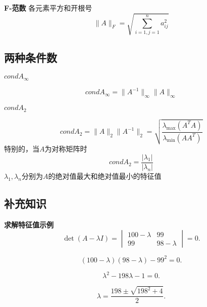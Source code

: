 \textbf{F-范数} \quad 各元素平方和开根号
    \[
    \|A\|_F = \sqrt{\sum_{i=1,j=1}^{n} a_{ij}^2}
    \]


\subsection{两种条件数}

\textbf{$condA_\infty$}

\[
condA_\infty = \|A^{-1}\|_{\infty} \|A\|_{\infty}
\]

\textbf{$condA_2$}

\[
condA_2 = \|A\|_{2} \|A^{-1}\|_{2} = \sqrt{\frac{\lambda_{\max}(A^T A)}{\lambda_{\min}(A A^T)}}
\]
特别的，当$A$为对称矩阵时
\[
condA_2 = \frac{|\lambda_{1}|}{|\lambda_{n}|}
\]
$\lambda_1,\lambda_n$分别为$A$的绝对值最大和绝对值最小的特征值

\subsection{补充知识}

\textbf{求解特征值示例}
\[
\det(A - \lambda I) = 
\begin{vmatrix}
100-\lambda & 99 \\[6pt]
99 & 98-\lambda 
\end{vmatrix}
= 0.
\]

\[
(100-\lambda)(98-\lambda) - 99^2 = 0.
\]

\[
\lambda^2 - 198\lambda - 1 = 0.
\]

\[
\lambda = \frac{198 \pm \sqrt{198^2+4}}{2}.
\]